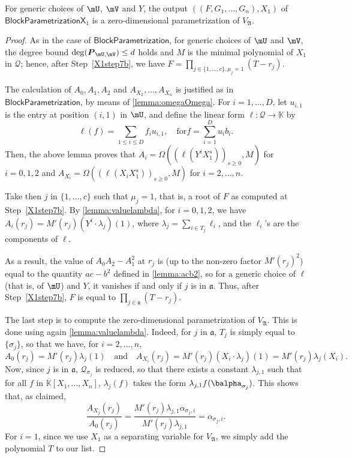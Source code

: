 \documentclass[12pt]{article}
\newcommand{\mat}[1]{\bm{\MakeUppercase{#1}}} %
\newcommand{\mainalgoname}{\mathsf{ BlockParametrization}}
\newcommand{\mf}{Y}
\newcommand{\residueI}{\mathscr{Q}}
\def\K{\mathbb{K}}
\def\K {\ensuremath{\mathbb{K}}}
\def\Kbar {{\ensuremath{\overline{\mathbb{K}}}}}
\begin{document}
\begin{lemma}
  For generic choices of $\mU$, $\mV$ and $\mf$, the output
  $((F,G_1,\dots,G_n),X_1)$ of $\mathsf{BlockParametrizationX}_1$ is a
  zero-dimensional parametrization of $V_{\mathfrak{A}}$.
\end{lemma}
\begin{proof}
  As in the case of $\mainalgoname$, for generic choices of $\mU$ and
  $\mV$, the degree bound $\deg(\mat{P}_{\mU,\mV}) \le d$ holds and
  $M$ is the minimal polynomial of $X_1$ in $\residueI$; hence, after
  Step~\ref{X1step7b}, we have $F=\prod_{j \in \{1,\dots,c\}, \mu_j=1}
  (T-r_j)$. 

  The calculation of $A_0,A_1,A_2$ and $A_{X_2},\dots,A_{X_n}$ is
  justified as in $\mainalgoname$, by means of
  \cref{lemma:omegaOmega}. For $i=1,\dots,D$, let $u_{i,1}$ is the entry at position
  $(i,1)$ in $\mU$, and define the linear 
form $\ell: \residueI \to \K$ by 
  $$\ell(f) = \sum_{1 \le i \le D} f_i u_{i,1}, \quad\text{for} f =
\sum_{i=1}^D u_i b_i.$$ Then, the above lemma proves that $A_i =
\Omega((\ell(\mf^i X_1^s))_{s\ge0},M)$ for $i=0,1,2$ and $A_{X_i} =
\Omega((\ell(X_i X_1^s))_{s\ge0},M)$ for $i=2,\dots,n$.

  Take then $j$ in $\{1,\dots,c\}$ such that $\mu_j=1$, that is, a
  root of $F$ as computed at Step~\ref{X1step7b}. By
  \cref{lemma:valuelambda}, for $i=0,1,2$, we have $ A_i(r_j) = M'(r_j)
  (\mf^i \cdot \lambda_j)(1)$, where $\lambda_j =\sum_{i \in T_j}
  \ell_i$, and the $\ell_i$'s are the components of $\ell$.
  
  As a result, the value of $ A_0  A_2 -  A_1^2$ at
  $r_j$ is (up to the non-zero factor $M'(r_j)^2$) equal to the
  quantity $ac-b^2$ defined in \cref{lemma:acb2}, so for a
  generic choice of $\ell$ (that is, of $\mU$) and $\mf$, it vanishes if and only if $j$ is
  in $\mathfrak{a}$. Thus, after Step~\ref{X1step7b}, 
  $F$ is equal to $\prod_{j \in \mathfrak{a}} (T-r_j)$.
	
  The last step is to compute the zero-dimensional parametrization of
  $V_{\mathfrak{A}}$. This is done using again
  \cref{lemma:valuelambda}. Indeed, for $j$ in $\mathfrak{a}$, 
  $T_j$ is simply equal to $\{\sigma_j\}$, so that we have, for $i=2,\dots,n$,
  $$ A_0(r_j)=M'(r_j) \lambda_j(1) \quad\text{and}\quad 
  A_{X_i}(r_j) = M'(r_j) (X_i \cdot \lambda_j)(1) = M'(r_j) \lambda_j(X_i).$$ Now, since $j$
  is in $\mathfrak{a}$, $\residueI_{\sigma_j}$ is reduced, so that there
  exists a constant $\lambda_{j,1}$ such that for all $f$ in
  $\Kbar[X_1,\dots,X_n]$, $\lambda_j(f)$ takes the form $\lambda_{j,1}
  f(\balpha_{\sigma_j})$. This shows that, as claimed,
  $$\frac{ A_{X_j}(r_j)}{ A_0 (r_j)} = 
  \frac
      {M'(r_j) \lambda_{j,1} \alpha_{\sigma_j,i}}{M'(r_j) \lambda_{j,1}} = \alpha_{\sigma_j,i}.$$
      For $i=1$, since we use $X_1$ as a separating variable for $V_{\mathfrak{A}}$, 
      we simply add the polynomial $T$ to our list.
\end{proof}
\end{document}
